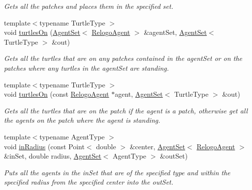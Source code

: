 \begin{DoxyCompactItemize}
\begin{DoxyCompactList}\small\item\em Gets all the patches and places them in the specified set. \end{DoxyCompactList}\item 
{\footnotesize template$<$typename Turtle\-Type $>$ }\\void \hyperlink{classrepast_1_1relogo_1_1_observer_aad4c5fbcf929481f361cca41c4b432ec}{turtles\-On} (\hyperlink{classrepast_1_1relogo_1_1_agent_set}{Agent\-Set}$<$ \hyperlink{classrepast_1_1relogo_1_1_relogo_agent}{Relogo\-Agent} $>$ \&agent\-Set, \hyperlink{classrepast_1_1relogo_1_1_agent_set}{Agent\-Set}$<$ Turtle\-Type $>$ \&out)
\begin{DoxyCompactList}\small\item\em Gets all the turtles that are on any patches contained in the agent\-Set or on the patches where any turtles in the agent\-Set are standing. \end{DoxyCompactList}\item 
{\footnotesize template$<$typename Turtle\-Type $>$ }\\void \hyperlink{classrepast_1_1relogo_1_1_observer_aedb92a41bdaafe4a179f2b4a027e7929}{turtles\-On} (const \hyperlink{classrepast_1_1relogo_1_1_relogo_agent}{Relogo\-Agent} $\ast$agent, \hyperlink{classrepast_1_1relogo_1_1_agent_set}{Agent\-Set}$<$ Turtle\-Type $>$ \&out)
\begin{DoxyCompactList}\small\item\em Gets all the turtles that are on the patch if the agent is a patch, otherwise get all the agents on the patch where the agent is standing. \end{DoxyCompactList}\item 
{\footnotesize template$<$typename Agent\-Type $>$ }\\void \hyperlink{classrepast_1_1relogo_1_1_observer_a1e832a3c9c59198c105e39e4820b4be3}{in\-Radius} (const Point$<$ double $>$ \&center, \hyperlink{classrepast_1_1relogo_1_1_agent_set}{Agent\-Set}$<$ \hyperlink{classrepast_1_1relogo_1_1_relogo_agent}{Relogo\-Agent} $>$ \&in\-Set, double radius, \hyperlink{classrepast_1_1relogo_1_1_agent_set}{Agent\-Set}$<$ Agent\-Type $>$ \&out\-Set)
\begin{DoxyCompactList}\small\item\em Puts all the agents in the in\-Set that are of the specified type and within the specified radius from the specified center into the out\-Set. \end{DoxyCompactList}\item 

\end{DoxyCompactItemize}

